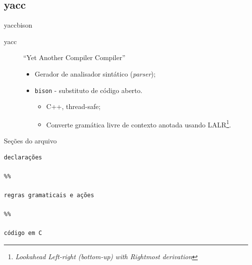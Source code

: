 \subsection{yacc}

\begin{frame}{yacc}{bison}
  \begin{description}
  \item[yacc]  ``Yet Another Compiler Compiler''
    \begin{itemize}
    \item Gerador de analisador sintático ({\it parser\/});
    \item \alert{\tt bison} - substituto de código aberto.
      \begin{itemize}
      \item C++, thread-safe;
      \item Converte gramática livre de contexto anotada usando
        LALR\footnote{{\it Lookahead Left-right (bottom-up) with
          Rightmost derivation\/}}.
      \end{itemize}
    \end{itemize}
  \end{description}
\end{frame}


\begin{frame}[fragile]{Seções do arquivo}
\begin{lstlisting}
declarações

%%

regras gramaticais e ações

%%

código em C

\end{lstlisting}
\end{frame}


